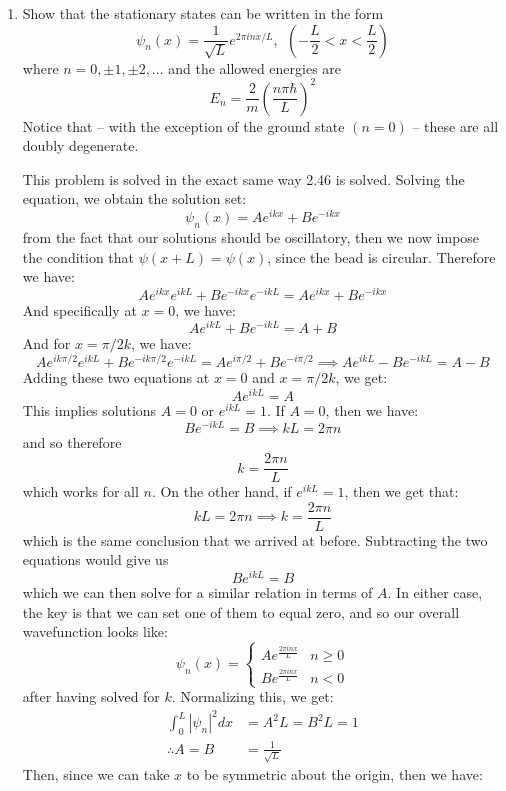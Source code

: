 \documentclass[10pt]{article}
\begin{document}
	\begin{enumerate}[label=\alph*)]
			\item Show that the stationary states can be written in the form
				\[ \psi_n(x) = \frac{1}{\sqrt{L} }e^{2\pi i n x /L}, \ \ 
					\left(-\frac{L}{2} < x < \frac{L}{2}\right)\]
				where $n = 0, \pm 1, \pm 2, \dots$ and the allowed energies are 
				\[ E_n = \frac{2}{m}\left( \frac{n \pi \hbar}{L}\right)^2\]
				Notice that -- with the exception of the ground state $(n =0)$ -- these are all doubly 
				degenerate.

				\begin{solution}
					This problem is solved in the exact same way 2.46 is solved. Solving the \schrodinger equation, we obtain the solution set: 
					\[ \psi_n(x) = Ae^{ikx} + Be^{-ikx}\] 
					from the fact that our solutions should be oscillatory, then we now impose the condition that $\psi(x + L) = \psi(x)$, since the bead is circular. Therefore we have:
					\[ Ae^{ikx}e^{ikL} + Be^{-ikx}e^{-ikL} = Ae^{ikx} + Be^{-ikx}\] 
					And specifically at $x = 0$, we have: 
					\[ Ae^{ikL} + Be^{-ikL} = A + B\]
					And for $x = \pi/2k$, we have: 
					\[ Ae^{ik \pi/2}e^{ikL} + Be^{-ik \pi/2}e^{-ikL} = Ae^{i\pi/2} + Be^{-i\pi/2} \implies Ae^{ikL} - Be^{-ikL} = A - B\] 
					Adding these two equations at $x = 0$ and $x = \pi/2k$, we get:
					\[Ae^{ikL} = A\]
					This implies solutions $A = 0$ or $e^{ikL} = 1$. If $A = 0$, then we have: 
					\[ Be^{-ikL} = B \implies kL = 2\pi n\]
					and so therefore 
					\[ k = \frac{2\pi n}{L}\]
					which works for all $n$. On the other hand, if $e^{ikL} = 1$, then we get that: 
					\[ kL = 2\pi n \implies k = \frac{2\pi n}{L}\]
					which is the same conclusion that we arrived at before. Subtracting the two equations would give us 
					\[ Be^{ikL} = B\]
					which we can then solve for a similar relation in terms of $A$. In either case, the key is that we can set one of them to equal zero, and so our overall wavefunction looks like: 
					\[\psi_n(x) = \begin{cases}Ae^{\frac{2\pi i n x}{L}} & n \geq 0\\ Be^{\frac{2\pi i n x}{L}} & n < 0\end{cases}\]
					after having solved for $k$. Normalizing this, we get:
					\begin{align*}
						\int_{0}^{L}|\psi_n|^2dx &= A^2L = B^2L = 1\\
						\therefore  A = B &= \frac{1}{\sqrt{L}}
					\end{align*}
					Then, since we can take $x$ to be symmetric about the origin, then we have:

\end{solution}
\end{enumerate}
\end{document}
